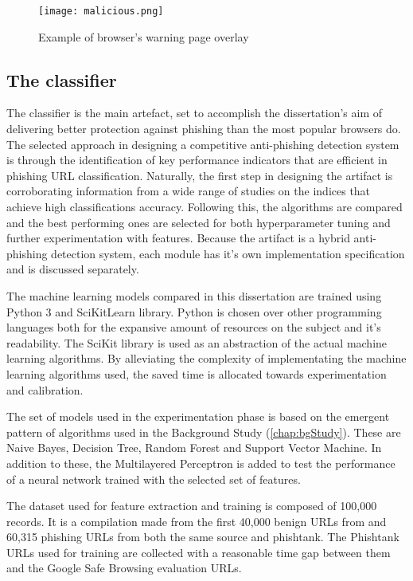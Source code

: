 \begin{figure}
	\centering
	\texttt{[image: malicious.png]}
	\caption{Example of browser's warning page overlay}
	\label{fig:PHISHING_PREVENTED}
\end{figure}

\subsection{The classifier}
The classifier is the main artefact, set to accomplish the dissertation's aim of delivering better protection against phishing than the most popular browsers do. The selected approach in designing a competitive anti-phishing detection system is through the identification of key performance indicators that are efficient in phishing URL classification. Naturally, the first step in designing the artifact is corroborating information from a wide range of studies on the indices that achieve high classifications accuracy. Following this, the algorithms are compared and the best performing ones are selected for both hyperparameter tuning and further experimentation with features.
Because the artifact is a hybrid anti-phishing detection system, each module has it's own implementation specification and is discussed separately.

The machine learning models compared in this dissertation are trained using Python 3 and SciKitLearn \citep{scikit-learn} library. Python is chosen over other programming languages both for the expansive amount of resources on the subject and it's readability. The SciKit library is used as an abstraction of the actual machine learning algorithms. By alleviating the complexity of implementating the machine learning algorithms used, the saved time is allocated towards experimentation and calibration.

The set of models used in the experimentation phase is based on the emergent pattern of algorithms used in the Background Study (\ref{chap:bgStudy}). These are Naive Bayes, Decision Tree, Random Forest and Support Vector Machine. In addition to these, the Multilayered Perceptron is added to test the performance of a neural network trained with the selected set of features.

The dataset used for feature extraction and training is composed of 100,000 records. It is a compilation made from the first 40,000 benign URLs from \cite{DATASET} and 60,315 phishing URLs from both the same source and phishtank. The Phishtank URLs used for training are collected with a reasonable time gap between them and the Google Safe Browsing evaluation URLs.

